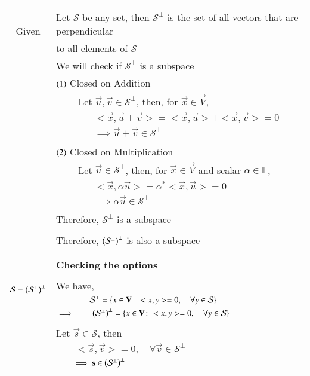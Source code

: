 \begin{longtable}{|c|l|}
    \hline
    \multirow{3}{*}{Given} 
	& \\
	& Let $\mathcal{S}$ be any set, then $\mathcal{S}^{\perp}$ is the set of all vectors that are perpendicular\\
	&to all elements of $\mathcal{S}$\\
	&We will check if $\mathcal{S}^{\perp}$ is a subspace\\
	&$\left(1\right)$ Closed on Addition\\
	& $\qquad$ Let $\vec{u},\vec{v} \in \mathcal{S}^{\perp}$, then, for $\vec{x}\in\vec{V}$,\\
	& $\qquad\qquad<\vec{x},\vec{u}+\vec{v}>=<\vec{x},\vec{u}>+<\vec{x},\vec{v}>=0$\\
	&$\qquad\qquad\implies \vec{u}+\vec{v} \in \mathcal{S}^{\perp}$\\
	&\\
	&$\left(2\right)$ Closed on Multiplication\\
	& $\qquad$ Let $\vec{u}\in \mathcal{S}^{\perp}$, then, for $\vec{x}\in\vec{V}$ and scalar $\alpha\in\mathbb{F}$,\\
	& $\qquad\qquad<\vec{x},\alpha \vec{u}>=\alpha^{*}<\vec{x},\vec{u}>=0$\\
	&$\qquad\qquad\implies \alpha \vec{u} \in \mathcal{S}^{\perp}$\\
	&\\
	&Therefore, $\mathcal{S}^{\perp}$ is a subspace\\
	&\\
	&Therefore, $\left(\mathcal{S}^{\perp}\right)^{\perp}$ is also a subspace\\
	&\\
	\hline
	&\\
	&\textbf{Checking the options}\\
	\hline
	\multirow{3}{*}{$\mathcal{S}=\left(\mathcal{S}^{\perp}\right)^{\perp}$} 
	& \\
	& We have,\\
	&$\qquad\qquad\mathcal{S}^{\perp}=\left\{x\in\mathbf{V}\colon<x,y>=0,\quad\forall y\in\mathcal{S}\right\}$\\
	&$\implies \qquad\left(\mathcal{S}^{\perp}\right)^{\perp}=\left\{x\in\mathbf{V}\colon<x,y>=0,\quad\forall y\in\mathcal{S}\right\}$\\
	&\\
	& Let $\vec{s}\in\mathcal{{S}}$, then\\
	&$\qquad <\vec{s},\vec{v}>=0,\quad\forall\vec{v}\in\mathcal{S}^{\perp}$\\
	&$\qquad\implies\mathbf{s}\in\left(\mathcal{S}^{\perp}\right)^{\perp}$\\

\end{longtable}
